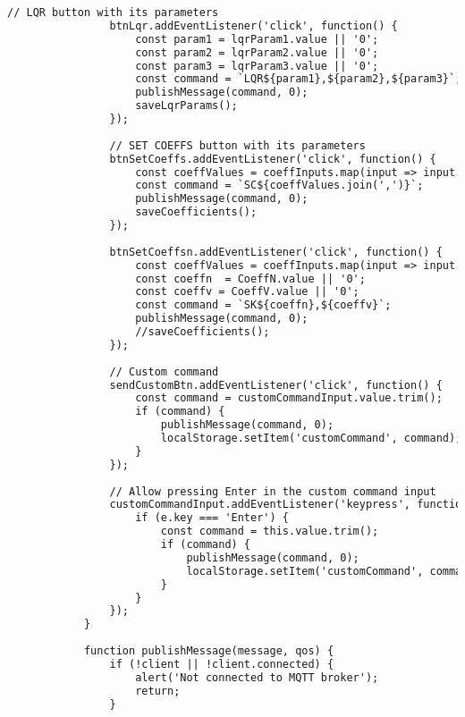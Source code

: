 \begin{lstlisting}[language=html]
                // LQR button with its parameters
                btnLqr.addEventListener('click', function() {
                    const param1 = lqrParam1.value || '0';
                    const param2 = lqrParam2.value || '0';
                    const param3 = lqrParam3.value || '0';
                    const command = `LQR${param1},${param2},${param3}`;
                    publishMessage(command, 0);
                    saveLqrParams();
                });
                
                // SET COEFFS button with its parameters
                btnSetCoeffs.addEventListener('click', function() {
                    const coeffValues = coeffInputs.map(input => input.value || '0');
                    const command = `SC${coeffValues.join(',')}`;
                    publishMessage(command, 0);
                    saveCoefficients();
                });
    
                btnSetCoeffsn.addEventListener('click', function() {
                    const coeffValues = coeffInputs.map(input => input.value || '0');
                    const coeffn  = CoeffN.value || '0';
                    const coeffv = CoeffV.value || '0';
                    const command = `SK${coeffn},${coeffv}`;
                    publishMessage(command, 0);
                    //saveCoefficients();
                });
                
                // Custom command
                sendCustomBtn.addEventListener('click', function() {
                    const command = customCommandInput.value.trim();
                    if (command) {
                        publishMessage(command, 0);
                        localStorage.setItem('customCommand', command);
                    }
                });
                
                // Allow pressing Enter in the custom command input
                customCommandInput.addEventListener('keypress', function(e) {
                    if (e.key === 'Enter') {
                        const command = this.value.trim();
                        if (command) {
                            publishMessage(command, 0);
                            localStorage.setItem('customCommand', command);
                        }
                    }
                });
            }
    
            function publishMessage(message, qos) {
                if (!client || !client.connected) {
                    alert('Not connected to MQTT broker');
                    return;
                }
                

\end{lstlisting}
